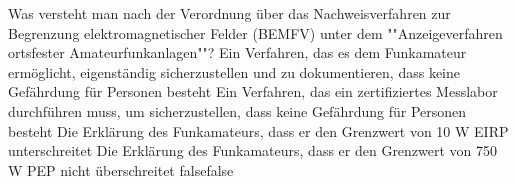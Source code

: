     {Was versteht man nach der Verordnung über das Nachweisverfahren zur Begrenzung elektromagnetischer Felder (BEMFV) unter dem ""Anzeigeverfahren ortsfester Amateurfunkanlagen""?}
    {Ein Verfahren, das es dem Funkamateur ermöglicht, eigenständig sicherzustellen und zu dokumentieren, dass keine Gefährdung für Personen besteht}
    {Ein Verfahren, das ein zertifiziertes Messlabor durchführen muss, um sicherzustellen, dass keine Gefährdung für Personen besteht}
    {Die Erklärung des Funkamateurs, dass er den Grenzwert von 10 W EIRP unterschreitet}
    {Die Erklärung des Funkamateurs, dass er den Grenzwert von 750 W PEP nicht überschreitet}
    {false}{false}